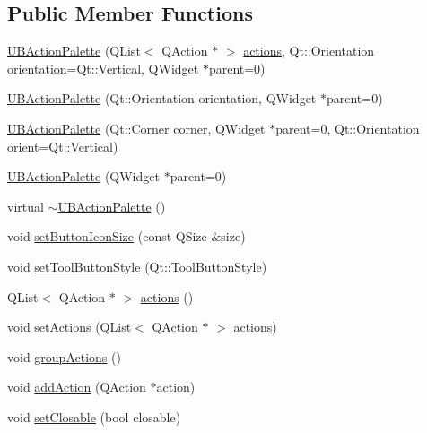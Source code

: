 \subsection*{Public Member Functions}
\begin{DoxyCompactItemize}
\item 
\hyperlink{class_u_b_action_palette_a389dab585e37f7e97617370ee784a514}{U\-B\-Action\-Palette} (Q\-List$<$ Q\-Action $\ast$ $>$ \hyperlink{class_u_b_action_palette_a6f0c33558354c13ccc5111cfa385a2ff}{actions}, Qt\-::\-Orientation orientation=Qt\-::\-Vertical, Q\-Widget $\ast$parent=0)
\item 
\hyperlink{class_u_b_action_palette_af27b698fd1048ac7845325efab7a9ac6}{U\-B\-Action\-Palette} (Qt\-::\-Orientation orientation, Q\-Widget $\ast$parent=0)
\item 
\hyperlink{class_u_b_action_palette_a56229c3647f4251ac469b829710d53a6}{U\-B\-Action\-Palette} (Qt\-::\-Corner corner, Q\-Widget $\ast$parent=0, Qt\-::\-Orientation orient=Qt\-::\-Vertical)
\item 
\hyperlink{class_u_b_action_palette_af4043dfbbdab01560ec3223338ab6d81}{U\-B\-Action\-Palette} (Q\-Widget $\ast$parent=0)
\item 
virtual \hyperlink{class_u_b_action_palette_adb5c981fe341b522159c32caf95dcbd5}{$\sim$\-U\-B\-Action\-Palette} ()
\item 
void \hyperlink{class_u_b_action_palette_a45a5c4986e2827bbc7f58baf584173e2}{set\-Button\-Icon\-Size} (const Q\-Size \&size)
\item 
void \hyperlink{class_u_b_action_palette_a8249b1aa5a356b7597e9ac39f274edd5}{set\-Tool\-Button\-Style} (Qt\-::\-Tool\-Button\-Style)
\item 
Q\-List$<$ Q\-Action $\ast$ $>$ \hyperlink{class_u_b_action_palette_a6f0c33558354c13ccc5111cfa385a2ff}{actions} ()
\item 
void \hyperlink{class_u_b_action_palette_ae928fec429c08192e49470821f3006f4}{set\-Actions} (Q\-List$<$ Q\-Action $\ast$ $>$ \hyperlink{class_u_b_action_palette_a6f0c33558354c13ccc5111cfa385a2ff}{actions})
\item 
void \hyperlink{class_u_b_action_palette_a13e41b19543a20da38b4eb86739f0af0}{group\-Actions} ()
\item 
void \hyperlink{class_u_b_action_palette_a116bac7a7085808b3b1c1fd51e124956}{add\-Action} (Q\-Action $\ast$action)
\item 
void \hyperlink{class_u_b_action_palette_a25fe51d89665542994b06d9a4cedfc89}{set\-Closable} (bool closable)
\item 

\end{DoxyCompactItemize}
